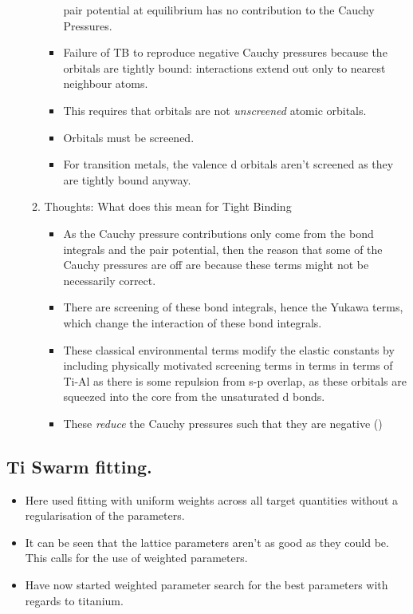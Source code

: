 \documentclass[11pt]{article}
\begin{document}
\begin{enumerate}
\begin{enumerate}
\begin{itemize}
pair potential at equilibrium has no contribution to the Cauchy
Pressures.
\item Failure of TB to reproduce negative Cauchy pressures because the
orbitals are tightly bound: interactions extend out only to nearest
neighbour atoms.
\item This requires that orbitals are not \emph{unscreened} atomic
orbitals.
\item Orbitals must be screened.
\item For transition metals, the valence d orbitals aren't screened as they are
tightly bound anyway.
\end{itemize}
\item Thoughts: What does this mean for Tight Binding
\label{sec:org4af980c}
\begin{itemize}
\item As the Cauchy pressure contributions only come from the bond integrals
and the pair potential, then the reason that some of the Cauchy
pressures are off are because these terms might not be necessarily
correct.
\item There are screening of these bond integrals, hence the Yukawa terms,
which change the interaction of these bond integrals.
\item These classical environmental terms modify the elastic constants by
including physically motivated screening terms in terms in terms of
Ti-Al as there is some repulsion from s-p overlap, as these orbitals
are squeezed into the core from the unsaturated d bonds.
\item These \emph{reduce} the Cauchy pressures such that they are negative
()
\end{itemize}
\end{enumerate}
\end{enumerate}
\subsection{Ti Swarm fitting.}
\label{sec:org509e288}
\begin{itemize}
\item Here used fitting with uniform weights across all target quantities
without a regularisation of the parameters.
\item It can be seen that the lattice parameters aren't as good as they could
be. This calls for the use of weighted parameters.
\item Have now started weighted parameter search for the best parameters with
regards to titanium.
\end{itemize}
\end{document}
